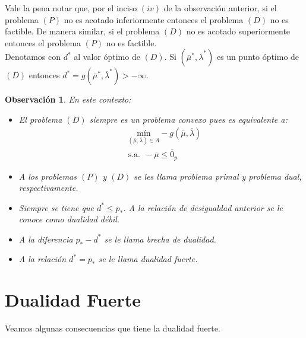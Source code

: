 \documentclass[11pt]{report}
\newtheorem{observation}{Observación}[section]
\newcommand{\mv}{\overline{\mu}}
\newcommand{\lv}{\overline{\lambda}}
\newcommand{\zp}{\overline{0}_{p}}
\newcommand{\po}{p_{*}}
\newcommand{\deo}{d^{*}}
\newcommand{\muo}{\overline{\mu}^{*}}
\newcommand{\lao}{\overline{\lambda}^{*}}
\newcommand{\mlo}{(\overline{\mu}^{*},\overline{\lambda}^{*})}
\begin{document}
 Vale la pena notar que, por el inciso $(iv)$ de la observación anterior, si el problema $(P)$ no es acotado inferiormente entonces el problema $(D)$ no es factible. De manera similar, si el problema $(D)$ no es acotado superiormente entonces el problema $(P)$ no es factible.\\

 Denotamos con $\deo$ al valor óptimo de $(D)$. Si $(\muo, \lao)$ es un punto óptimo de $(D)$ entonces $\deo=g\mlo>-\infty$.\\

\begin{observation}
En este contexto:
\begin{itemize}
\item[(i)] El problema $(D)$ siempre es un problema convexo pues es equivalente a:
\begin{equation*}
\begin{aligned}
& \underset{(\mv,\lv)\in A}{\text{mín}} -g(\mv,\lv) \\
& \text{s.a.}\ \ -\mv\leq\zp
\end{aligned}
\end{equation*}
\item[(ii)] A los problemas $(P)$ y $(D)$ se les llama \emph{problema primal} y \emph{problema dual}, respectivamente.
\item[(iii)] Siempre se tiene que $\deo\leq\po$. A la relación de desigualdad anterior se le conoce como \emph{dualidad débil}.
\item[(iv)] A la diferencia $\po - \deo$ se le llama \emph{brecha de dualidad}.
\item[(v)] A la relación $\deo=\po$ se le llama \emph{dualidad fuerte}.

\end{itemize}
\end{observation}

\section{Dualidad Fuerte}
\noindent
Veamos algunas consecuencias que tiene la dualidad fuerte.
\end{document}
